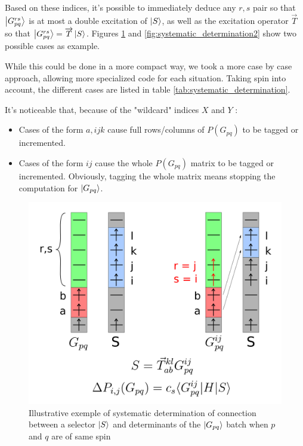 \documentclass[./thesis.tex]{subfiles}
\begin{document}
Based on these indices, it's possible to immediately deduce any $r,s$ pair so that $\ket {G_{pq}^{rs}}$ is at most a double excitation of $\ket S$, as well as the excitation operator $\overrightarrow{T}$ so that $\ket {G_{pq}^{rs}}=\overrightarrow{T} \ket S$. Figures \ref{fig:systematic_determination} and \ref{fig:systematic_determination2} show two possible cases as example.

While this could be done in a more compact way, we took a more case by case approach, allowing more specialized code for each situation. Taking spin into account, the different cases are listed in table \ref{tab:systematic_determination}.


It's noticeable that, because of the "wildcard" indices $X$ and $Y$ :
\begin{itemize}

\item
Cases of the form $a,ijk$ cause full rows/columns of $P(G_{pq})$ to be tagged or incremented.
\item
Cases of the form $ij$ cause the whole $P(G_{pq})$ matrix to be tagged or incremented. Obviously, tagging the whole matrix means stopping the computation for $\ket {G_{pq}}$.
\end{itemize}

\begin{figure}[h!]
	\begin{center}
		\includegraphics[width=0.70\columnwidth]{figures/cipsi/systematic_determination}
		\caption{Illustrative exemple of systematic determination of connection between a selector $\ket S$ and determinants of the $\ket {G_{pq}}$ batch when $p$ and $q$ are of same spin}
		\label{fig:systematic_determination}
	\end{center}
	
\end{figure}
\end{document}
